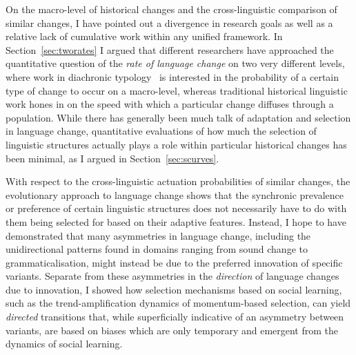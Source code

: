 On the macro-level of historical changes and the cross-linguistic comparison of similar changes, I have pointed out a divergence in research goals as well as a relative lack of cumulative work within any unified framework. In Section~\ref{sec:tworates} I argued that different researchers have approached the quantitative question of the \emph{rate of language change} on two very different levels, where work in diachronic typology~\citep[such as][]{Bickel2015} is interested in the probability of a certain type of change to occur on a macro-level, whereas traditional historical linguistic work hones in on the speed with which a particular change diffuses through a population.
While there has generally been much talk of adaptation and selection in language change, quantitative evaluations of how much the selection of linguistic structures actually plays a role within particular historical changes has been minimal, as I argued in Section~\ref{sec:scurves}.

With respect to the cross-linguistic actuation probabilities of similar changes, the evolutionary approach to language change shows that the synchronic prevalence or preference of certain linguistic structures does not necessarily have to do with them being selected for based on their adaptive features. Instead, I hope to have demonstrated that many asymmetries in language change, including the unidirectional patterns found in domains ranging from sound change to grammaticalisation, might instead be due to the preferred innovation of specific variants. Separate from these asymmetries in the \emph{direction} of language changes due to innovation, I showed how selection mechanisms based on social learning, such as the trend-amplification dynamics of momentum-based selection, can yield \emph{directed} transitions that, while superficially indicative of an asymmetry between variants, are based on biases which are only temporary and emergent from the dynamics of social learning.



